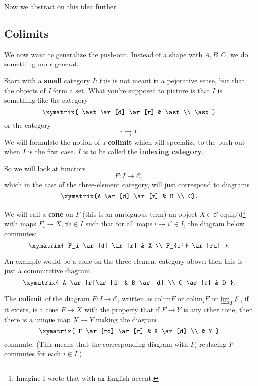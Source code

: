 Now we abstract on this idea further.

\subsection{Colimits}


We now want to generalize the push-out.
Instead of a shape with $A,B,C$, we do something more general.

Start with a \textbf{small} category $I$: this is not meant in a pejorative
sense, but that the objects of $I$ form a set. What you're supposed to picture
is that $I$ is something like the category
\[
\xymatrix{
\ast \ar[d] \ar[r] &  \ast \\
\ast
}
\]
or the category
\[ \ast \rightrightarrows \ast.  \]
We will formulate the notion of a \textbf{colimit} which will specialize to the
push-out when $I$ is the first case. $I$ is to be called  the  \textbf{indexing
category}.


So we will look at functors
\[ F: I \to \mathcal{C},  \]
which in the case of the three-element category, will just
 correspond to
diagrams
\[ \xymatrix{A \ar[d]  \ar[r] &  B \\ C}.  \]

We will call a \textbf{cone} on $F$ (this is an ambiguous term) an object $X
\in \mathcal{C}$ equip'd\footnote{Imagine I wrote that with an English accent.}
with maps $F_i \to X, \forall i \in I$ such that for all maps $i \to
i' \in I$, the diagram below commutes:
\[ \xymatrix{
F_i \ar[d] \ar[r] &  X \\
F_{i'} \ar[ru]
}.\]

An example would be a cone on the three-element category above: then
this is just a commutative diagram
\[ \xymatrix{
A \ar[r]\ar[d]  &  B \ar[d]  \\
C \ar[r] &  D
}.\]

\newcommand{\colim}{\mathrm{colim}}

\begin{definition}
The \textbf{colimit} of the diagram $F: I \to \mathcal{C}$, written as $\colim
F$ or $\colim_I F $ or $\varinjlim_I F$, if it exists, is a cone $F \to X$ with
the property that if $F \to Y$ is any other cone, then there is a unique map $X
\to Y$ making the diagram
\[ \xymatrix{
F  \ar[rd] \ar[r] &  X \ar[d]  \\
& Y
}\]
commute. (This means that the corresponding diagram with $F_i$ replacing $F$
commutes for each $i \in I$.)
\end{definition}

